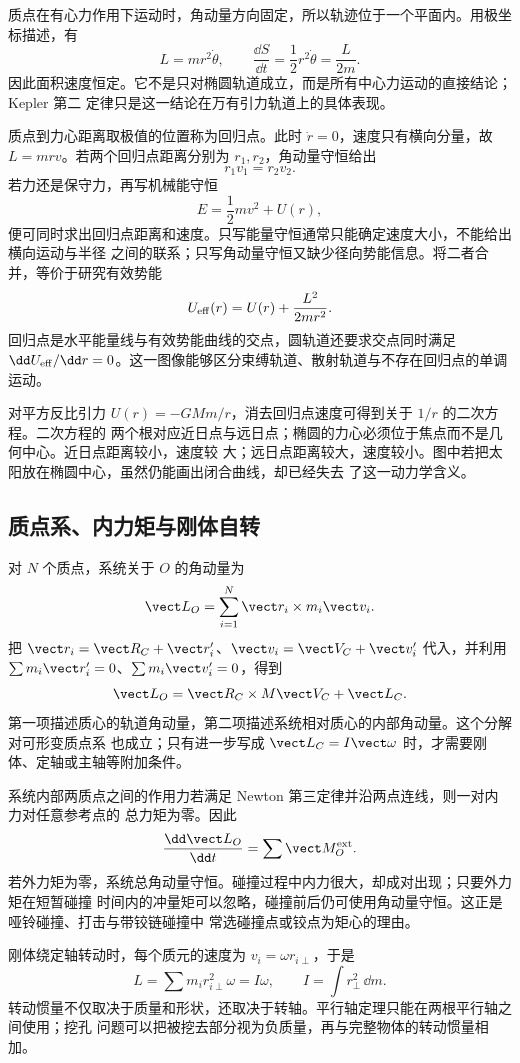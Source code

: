 质点在有心力作用下运动时，角动量方向固定，所以轨迹位于一个平面内。用极坐标描述，有
\[
  L=mr^2\dot\theta,
  \qquad
  \frac{\dd S}{\dd t}=\frac12r^2\dot\theta=\frac{L}{2m}.
\]
因此面积速度恒定。它不是只对椭圆轨道成立，而是所有中心力运动的直接结论；Kepler 第二
定律只是这一结论在万有引力轨道上的具体表现。

质点到力心距离取极值的位置称为回归点。此时 $\dot r=0$，速度只有横向分量，故
$L=mrv$。若两个回归点距离分别为 $r_1,r_2$，角动量守恒给出
\[
  r_1v_1=r_2v_2.
\]
若力还是保守力，再写机械能守恒
\[
  E=\frac12mv^2+U(r),
\]
便可同时求出回归点距离和速度。只写能量守恒通常只能确定速度大小，不能给出横向运动与半径
之间的联系；只写角动量守恒又缺少径向势能信息。将二者合并，等价于研究有效势能
\[
  U_{\rm eff}(r)=U(r)+\frac{L^2}{2mr^2}.
\]
回归点是水平能量线与有效势能曲线的交点，圆轨道还要求交点同时满足
$\dd U_{\rm eff}/\dd r=0$。这一图像能够区分束缚轨道、散射轨道与不存在回归点的单调运动。

对平方反比引力 $U(r)=-GMm/r$，消去回归点速度可得到关于 $1/r$ 的二次方程。二次方程的
两个根对应近日点与远日点；椭圆的力心必须位于焦点而不是几何中心。近日点距离较小，速度较
大；远日点距离较大，速度较小。图中若把太阳放在椭圆中心，虽然仍能画出闭合曲线，却已经失去
了这一动力学含义。

\subsection*{质点系、内力矩与刚体自转}

对 $N$ 个质点，系统关于 $O$ 的角动量为
\[
  \vect L_O=\sum_{i=1}^{N}\vect r_i\times m_i\vect v_i.
\]
把 $\vect r_i=\vect R_C+\vect r'_i$、$\vect v_i=\vect V_C+\vect v'_i$ 代入，并利用
$\sum m_i\vect r'_i=0$、$\sum m_i\vect v'_i=0$，得到
\[
  \vect L_O=\vect R_C\times M\vect V_C+\vect L_C.
\]
第一项描述质心的轨道角动量，第二项描述系统相对质心的内部角动量。这个分解对可形变质点系
也成立；只有进一步写成 $\vect L_C=I\vect\omega$ 时，才需要刚体、定轴或主轴等附加条件。

系统内部两质点之间的作用力若满足 Newton 第三定律并沿两点连线，则一对内力对任意参考点的
总力矩为零。因此
\[
  \frac{\dd\vect L_O}{\dd t}=\sum\vect M_O^{\rm ext}.
\]
若外力矩为零，系统总角动量守恒。碰撞过程中内力很大，却成对出现；只要外力矩在短暂碰撞
时间内的冲量矩可以忽略，碰撞前后仍可使用角动量守恒。这正是哑铃碰撞、打击与带铰链碰撞中
常选碰撞点或铰点为矩心的理由。

刚体绕定轴转动时，每个质元的速度为 $v_i=\omega r_{i\perp}$，于是
\[
  L=\sum m_i r_{i\perp}^2\omega=I\omega,
  \qquad I=\int r_\perp^2\,\dd m.
\]
转动惯量不仅取决于质量和形状，还取决于转轴。平行轴定理只能在两根平行轴之间使用；挖孔
问题可以把被挖去部分视为负质量，再与完整物体的转动惯量相加。

